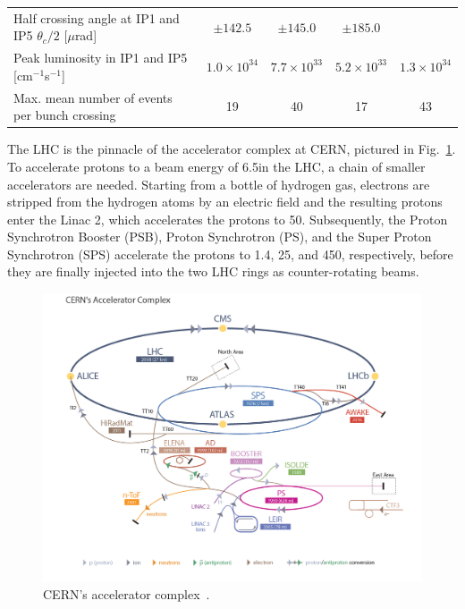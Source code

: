 \begin{table}
{\begin{tabular}{l|cccc}
Half crossing angle at IP1 and IP5 $\theta_c/2$ [$\mu$rad] & $\pm142.5$ & $\pm145.0$ & $\pm185.0$\\
Peak luminosity in IP1 and IP5 [cm$^{-1}$s$^{-1}$] &$1.0\times10^{34}$& $7.7\times10^{33}$ & $5.2\times10^{33}$& $1.3\times10^{34}$  \\
Max. mean number of events per bunch crossing& 19 & 40 & 17 & 43\\\hline\hline
\end{tabular}
}
\end{table}

The LHC is the pinnacle of the accelerator
complex at CERN, pictured in Fig.~\ref{fig:LHCComplex}.  To accelerate
protons to a beam energy of 6.5\TeV in the LHC, a chain of smaller
accelerators are needed. Starting from a bottle of hydrogen gas,
electrons are stripped from the hydrogen atoms by an electric field
and the resulting protons enter the Linac 2, which accelerates the
protons to 50\MeV. Subsequently, the Proton Synchrotron Booster (PSB), Proton Synchrotron (PS), and the
Super Proton Synchrotron (SPS) accelerate the protons to 1.4\GeV, 25\GeV, and 450\GeV, respectively, before they are finally injected
into the two LHC rings as counter-rotating beams.

\begin{figure}\centering
\includegraphics[width=.9\textwidth]{figs/cms/LHC_default.jpg}
\caption{CERN's accelerator complex~\cite{LHCMachine}.\label{fig:LHCComplex}}
\end{figure}

